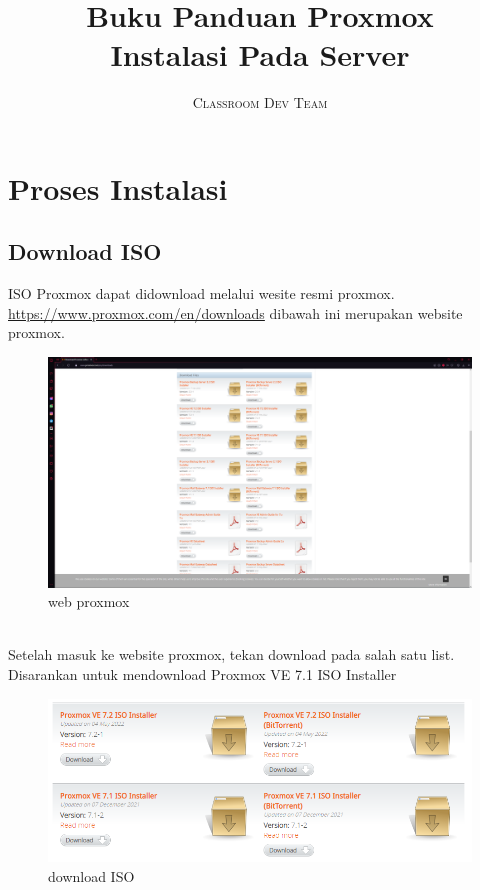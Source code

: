 \documentclass{article}
\title{
  \huge
  \textbf{Buku Panduan Proxmox}
  \\
  \huge
  Instalasi Pada Server
}
\author{
  \textsc{Classroom Dev Team}
}
\begin{document}
  \maketitle

  \newpage

  \newpage
  \section{Proses Instalasi}
  \subsection{Download ISO}
  ISO Proxmox dapat didownload melalui wesite resmi proxmox. \url{https://www.proxmox.com/en/downloads}
  dibawah ini merupakan website proxmox.
  \begin{figure}[h!]
    \centering
    \includegraphics[width=1\linewidth]{proxmox web.png}
    \caption{web proxmox}
  \end{figure}
  \\ Setelah masuk ke website proxmox, tekan download pada salah satu list. Disarankan untuk mendownload Proxmox VE 7.1 ISO Installer
  \begin{figure}[h!]
    \centering
    \includegraphics[width=1\linewidth]{proxmox download.png}
    \caption{download ISO}
  \end{figure}
\end{document}

